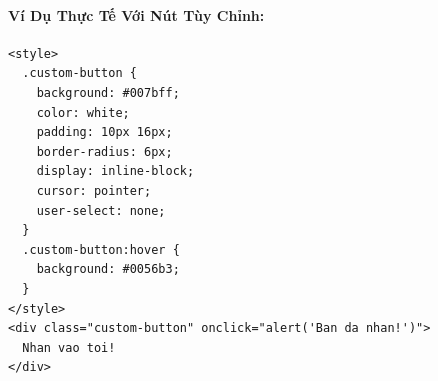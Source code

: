 \documentclass[11pt,oneside]{book}
\begin{document}
\paragraph{Ví Dụ Thực Tế Với Nút Tùy Chỉnh:}

\begin{codeWindow}
\begin{lstlisting}[language=HTML5]
<style>
  .custom-button {
    background: #007bff;
    color: white;
    padding: 10px 16px;
    border-radius: 6px;
    display: inline-block;
    cursor: pointer;
    user-select: none;
  }
  .custom-button:hover {
    background: #0056b3;
  }
</style>
<div class="custom-button" onclick="alert('Ban da nhan!')">
  Nhan vao toi!
</div>
\end{lstlisting}
\end{codeWindow}
\end{document}
